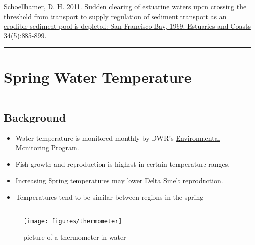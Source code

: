 \documentclass[
]{book}
\providecommand{\tightlist}{%
  \setlength{\itemsep}{0pt}\setlength{\parskip}{0pt}}
\begin{document}
\begin{disclaimer}
\href{https://link.springer.com/article/10.1007/s12237-011-9382-x}{Schoellhamer,
D. H. 2011. Sudden clearing of estuarine waters upon crossing the
threshold from transport to supply regulation of sediment transport as
an erodible sediment pool is depleted: San Francisco Bay, 1999.
Estuaries and Coasts 34(5):885-899.}
\end{disclaimer}

\begin{center}\rule{0.5\linewidth}{0.5pt}\end{center}

\hypertarget{spring-water-temperature}{%
\section{Spring Water Temperature}\label{spring-water-temperature}}

\begin{columns-nocenter}

\begin{column}

\hypertarget{background-1}{%
\subsection{Background}\label{background-1}}

\begin{itemize}
\tightlist
\item
  Water temperature is monitored monthly by DWR's \href{https://emp.baydeltalive.com/wiki/12297}{Environmental Monitoring Program}.
\item
  Fish growth and reproduction is highest in certain temperature ranges.
\item
  Increasing Spring temperatures may lower Delta Smelt reproduction.
\item
  Temperatures tend to be similar between regions in the spring.
\end{itemize}

\end{column}

\begin{column}

\begin{figure}

{\centering \texttt{[image: figures/thermometer]} 

}

\caption{picture of a thermometer in water}\label{fig:unnamed-chunk-12}
\end{figure}

\end{column}

\end{columns-nocenter}
\end{document}

